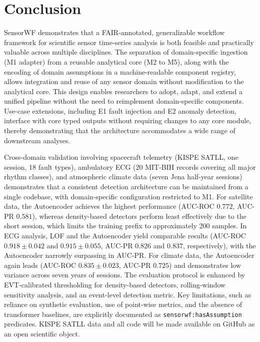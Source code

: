 \documentclass[conference]{IEEEtran}
\begin{document}

\section{Conclusion}

SensorWF demonstrates that a FAIR-annotated, generalizable workflow framework for scientific sensor time-series analysis is both feasible and practically valuable across multiple disciplines. The separation of domain-specific ingestion (M1 adapter) from a reusable analytical core (M2 to M5), along with the encoding of domain assumptions in a machine-readable component registry, allows integration and reuse of any sensor domain without modification to the analytical core. This design enables researchers to adopt, adapt, and extend a unified pipeline without the need to reimplement domain-specific components. Use-case extensions, including E1 fault injection and E2 anomaly detection, interface with core typed outputs without requiring changes to any core module, thereby demonstrating that the architecture accommodates a wide range of downstream analyses.

Cross-domain validation involving spacecraft telemetry (KISPE SATLL, one session, 18 fault types), ambulatory ECG (20 MIT-BIH records covering all major rhythm classes), and atmospheric climate data (seven Jena half-year sessions) demonstrates that a consistent detection architecture can be maintained from a single codebase, with domain-specific configuration restricted to M1. For satellite data, the Autoencoder achieves the highest performance (AUC-ROC $0.772$, AUC-PR $0.581$), whereas density-based detectors perform least effectively due to the short session, which limits the training prefix to approximately 200 samples. In ECG analysis, LOF and the Autoencoder yield comparable results (AUC-ROC $0.918\pm0.042$ and $0.915\pm0.055$, AUC-PR $0.826$ and $0.837$, respectively), with the Autoencoder narrowly surpassing in AUC-PR. For climate data, the Autoencoder again leads (AUC-ROC $0.835\pm0.023$, AUC-PR $0.725$) and demonstrates low variance across seven years of sessions. The evaluation protocol is enhanced by EVT-calibrated thresholding for density-based detectors, rolling-window sensitivity analysis, and an event-level detection metric. Key limitations, such as reliance on synthetic evaluation, use of point-wise metrics, and the absence of transformer baselines, are explicitly documented as \texttt{sensorwf:hasAssumption} predicates. KISPE SATLL data and all code will be made available on GitHub as an open scientific object.
\end{document}
